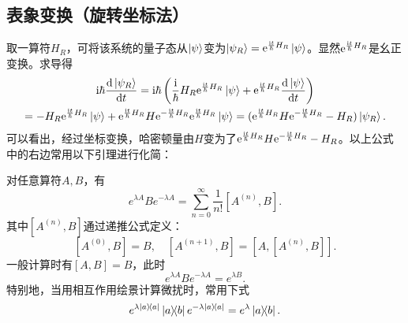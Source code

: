 \documentclass[
fontsetup = font-setup-open.tex,
titlesetup = titles-setup.tex
]{AJbook}
\numberwithin{equation}{section}
\begin{document}
\subsection{表象变换（旋转坐标法）}
取一算符$ H_R $，可将该系统的量子态从$ \ket{\psi} $变为$ \ket{\psi_R}=\mathrm{e}^{\frac{\mathrm{i}t}{\hbar} H_R}\ket{\psi} $。显然$ \mathrm{e}^{\frac{\mathrm{i}t}{\hbar} H_R} $是幺正变换。求导得
\begin{equation}\label{key}
\begin{gathered}
\mathrm{i}\hbar\frac{\mathrm{d}\ket{\psi_R}}{\mathrm{d}t}
=\mathrm{i}\hbar\left(\frac{\mathrm{i}}{\hbar}H_R\mathrm{e}^{\frac{\mathrm{i}t}{\hbar} H_R}\ket{\psi}+\mathrm{e}^{\frac{\mathrm{i}t}{\hbar} H_R}\frac{\mathrm{d}\ket{\psi}}{\mathrm{d}t}\right)\\
=-H_R\mathrm{e}^{\frac{\mathrm{i}t}{\hbar} H_R}\ket{\psi}+\mathrm{e}^{\frac{\mathrm{i}t}{\hbar} H_R}H\mathrm{e}^{-\frac{\mathrm{i}t}{\hbar} H_R}\mathrm{e}^{\frac{\mathrm{i}t}{\hbar} H_R}\ket{\psi}
=(\mathrm{e}^{\frac{\mathrm{i}t}{\hbar} H_R}H\mathrm{e}^{-\frac{\mathrm{i}t}{\hbar} H_R}-H_R)\ket{\psi_R}.
\end{gathered}
\end{equation}
可以看出，经过坐标变换，哈密顿量由$ H $变为了$ \mathrm{e}^{\frac{\mathrm{i}t}{\hbar} H_R}H\mathrm{e}^{-\frac{\mathrm{i}t}{\hbar} H_R}-H_R $。以上公式中的右边常用以下引理进行化简：
\begin{lemma}[曾谨言习题4.37]\label{zjy437}
对任意算符$ A,B $，有
\begin{equation}\label{key}
e^{\lambda A}Be^{-\lambda A}=\sum_{n=0}^{\infty}\frac{1}{n!}[A^{(n)},B].
\end{equation}
其中$ [A^{(n)},B] $通过递推公式定义：
\begin{equation}\label{key}
[A^{(0)},B]=B,\quad [A^{(n+1)},B]=[A,[A^{(n)},B]].
\end{equation}
一般计算时有$ [A,B]=B $，此时
\begin{equation}\label{key}
e^{\lambda A}Be^{-\lambda A}=e^{\lambda B}.
\end{equation}
特别地，当用相互作用绘景计算微扰时，常用下式
\begin{equation}\label{key}
e^{\lambda\ketbra{a}{a}}\ketbra{a}{b}e^{-\lambda\ketbra{a}{a}}=e^{\lambda}\ketbra{a}{b}.
\end{equation}
\end{lemma}
\end{document}
